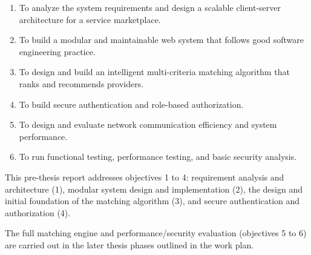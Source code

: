 \begin{enumerate}
	\item To analyze the system requirements and design a scalable client-server
	      architecture for a service marketplace.
	\item To build a modular and maintainable web system that follows good
	      software engineering practice.
	\item To design and build an intelligent multi-criteria matching algorithm
	      that ranks and recommends providers.
	\item To build secure authentication and role-based authorization.
	\item To design and evaluate network communication efficiency and system
	      performance.
	\item To run functional testing, performance testing, and basic security
	      analysis.
\end{enumerate}

This pre-thesis report addresses objectives 1 to 4: requirement analysis and
architecture (1), modular system design and implementation (2), the design and
initial foundation of the matching algorithm (3), and secure authentication and
authorization (4).

The full matching engine and performance/security evaluation
(objectives 5 to 6) are carried out in the later thesis phases outlined in the work
plan.
